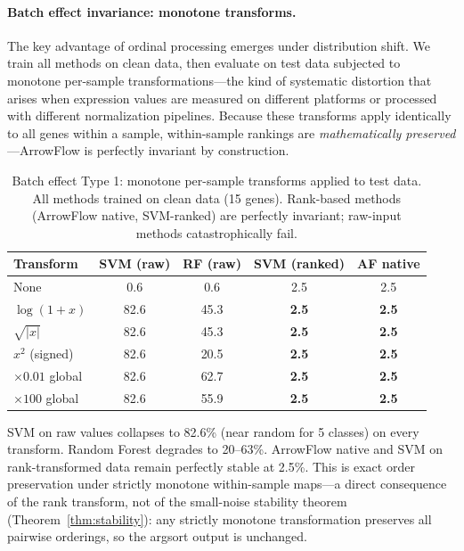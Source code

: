 \documentclass[12pt]{article}
\begin{document}
\paragraph{Batch effect invariance: monotone transforms.}
The key advantage of ordinal processing emerges under distribution shift. We train all methods on clean data, then evaluate on test data subjected to monotone per-sample transformations---the kind of systematic distortion that arises when expression values are measured on different platforms or processed with different normalization pipelines. Because these transforms apply identically to all genes within a sample, within-sample rankings are \emph{mathematically preserved}---ArrowFlow is perfectly invariant by construction.

\begin{table}[ht]
\centering
\caption{Batch effect Type 1: monotone per-sample transforms applied to test data. All methods trained on clean data (15 genes). Rank-based methods (ArrowFlow native, SVM-ranked) are perfectly invariant; raw-input methods catastrophically fail.}
\label{tab:gene-monotone}
\small
\begin{tabular}{lcccc}
\toprule
Transform & SVM (raw) & RF (raw) & SVM (ranked) & AF native \\
\midrule
None              & 0.6  & 0.6  & 2.5 & 2.5 \\
$\log(1+x)$      & 82.6 & 45.3 & \textbf{2.5} & \textbf{2.5} \\
$\sqrt{|x|}$     & 82.6 & 45.3 & \textbf{2.5} & \textbf{2.5} \\
$x^2$ (signed)   & 82.6 & 20.5 & \textbf{2.5} & \textbf{2.5} \\
$\times 0.01$ global & 82.6 & 62.7 & \textbf{2.5} & \textbf{2.5} \\
$\times 100$ global  & 82.6 & 55.9 & \textbf{2.5} & \textbf{2.5} \\
\bottomrule
\end{tabular}
\end{table}

SVM on raw values collapses to 82.6\% (near random for 5 classes) on every transform. Random Forest degrades to 20--63\%. ArrowFlow native and SVM on rank-transformed data remain perfectly stable at 2.5\%. This is exact order preservation under strictly monotone within-sample maps---a direct consequence of the rank transform, not of the small-noise stability theorem (Theorem~\ref{thm:stability}): any strictly monotone transformation preserves all pairwise orderings, so the argsort output is unchanged.
\end{document}

